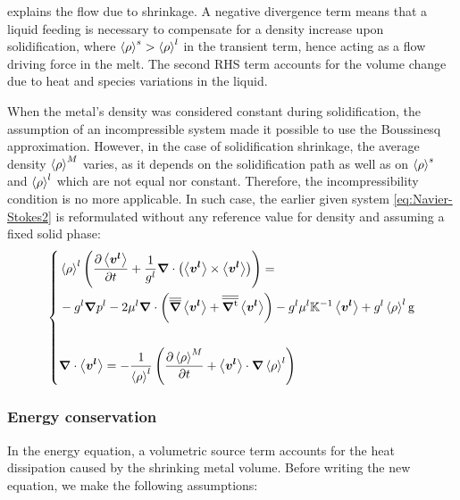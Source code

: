  explains the flow due to shrinkage. 
A negative divergence term means that a liquid feeding 
is necessary to compensate for a density increase upon solidification, where $\left \langle \rho \right \rangle^s > \left \langle \rho \right \rangle^l$ in the transient term, 
hence acting as a flow driving force in the melt.
The second RHS term accounts for the volume change 
due to heat and species variations in the liquid.


When the metal's density was considered constant during solidification, 
the assumption of an incompressible system made it possible to
use the Boussinesq approximation. However, in the case of solidification shrinkage, 
the average density ${\left \langle \rho \right \rangle}^M$ varies, as it depends on the solidification 
path as well as on $\left \langle \rho \right \rangle^s$ and $\left \langle \rho \right \rangle^l$ which are not equal nor constant.
Therefore, the incompressibility condition is no more applicable. In such case, 
the earlier given system \cref{eq:Navier-Stokes2} is reformulated without 
any reference value for density and assuming a fixed solid phase:
\begin{equation}
\label{eq:momentum_balance_metal}
   \left\{
   \begin{aligned}
      & \rhol \brac{\tempup{ \vit } + \frac{1}{\gl} \nabvec \cdot \brac{\vit \times \vit}} = \\
	  &- \gl\nabvec \pl - 2 \mul \nabvec \cdot \brac{\nabmat \vit + \nabmattransp \vit}
	  - \gl \mul \K^{-1} \vit + \gl \rhol \gravity\\ \\
      & \nabvec \cdot \vit = -\frac{1}{\rhol} \brac{\tempup{\avg{\rho}^M} + \vit \cdot  \nabvec \rhol}
    \end{aligned}
    \right.
\end{equation}

\subsubsection{Energy conservation}
In the energy equation, a volumetric source term accounts for the heat dissipation 
caused by the shrinking metal volume. Before writing the new equation, we make the following assumptions:

